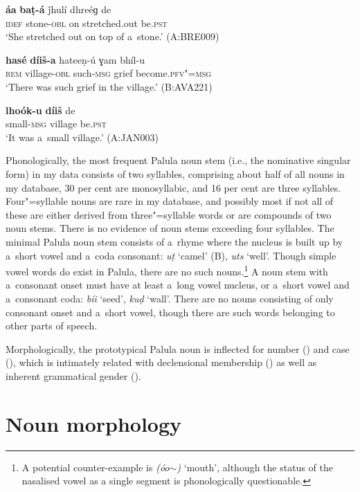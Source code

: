 \begin{exe}
\ex
\label{ex:4-4}
\gll \textbf{áa} \textbf{baṭ-á} ǰhulí dhreéɡ de \\ 
\textsc{idef} stone-\textsc{obl} on stretched.out be.\textsc{pst} \\
\glt `She stretched out on top of a~stone.' (A:BRE009)

\ex
\label{ex:4-5}
\gll \textbf{hasé} \textbf{díiš-a} hateeṇ-ú ɣam bhíl-u \\
	\textsc{rem} village-\textsc{obl} such-\textsc{msg} grief become.\textsc{pfv"=msg} \\
\glt `There was such grief in the village.' (B:AVA221)

\ex
\label{ex:4-5b}
\gll \textbf{lhoók-u} \textbf{díiš} de \\
small-\textsc{msg} village be.\textsc{pst} \\
\glt `It was a~small village.' (A:JAN003)
\end{exe}


Phonologically, the most frequent Palula noun stem (i.e., the nominative singular form) in my data consists of two syllables, comprising about half of all nouns in my database, 30 per cent are monosyllabic, and 16 per cent are three syllables. Four"=syllable nouns are rare in my database, and possibly most if not all of these are either derived from three"=syllable words or are compounds of two noun stems. There is no evidence of noun stems exceeding four syllables. The minimal Palula noun stem consists of a~rhyme where the nucleus is built up by a~short vowel and a~coda consonant: \textit{uṭ} `camel' (B), \textit{uts} `well'. Though simple vowel words do exist in Palula, there are no such nouns.\footnote{A potential counter-example is \textit{(óo$\sim$)} `mouth', although the status of the nasalised vowel as a single segment is phonologically questionable.} A noun stem with a~consonant onset must have at least a~long vowel nucleus, or a~short vowel and a~consonant coda: \textit{bíi} `seed', \textit{kuḍ} `wall'. There are no nouns consisting of only consonant onset and a~short vowel, though there are such words belonging to other parts of speech.


Morphologically, the prototypical Palula noun is inflected for number () and case (), which is intimately related with declensional membership () as well as inherent grammatical gender (). 


\section{Noun morphology}
\label{sec:4-2}

